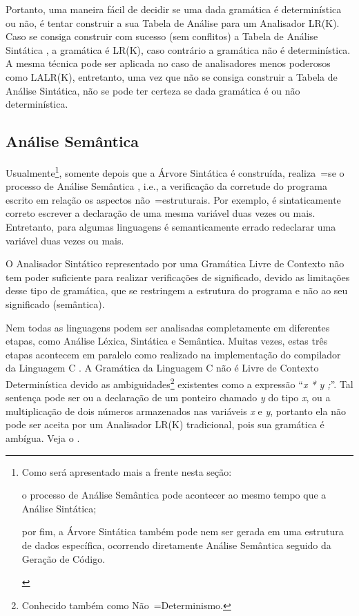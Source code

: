 Portanto,
uma maneira fácil de decidir se uma dada gramática é determinística ou
não,
é tentar construir a sua Tabela de Análise para um Analisador LR(K).
Caso se consiga construir com sucesso (sem conflitos) a Tabela de Análise Sintática \cite{ahoCompilerDragonBook},
a gramática é LR(K),
caso contrário a gramática não é determinística.
A mesma técnica pode ser aplicada no caso de analisadores menos poderosos como LALR(K),
entretanto,
uma vez que não se consiga construir a Tabela de Análise Sintática,
não se pode ter certeza se dada gramática é ou
não determinística.


\subsection{Análise Semântica}
\label{analiseSemantica}

Usualmente\footnote{
Como será apresentado mais a frente nesta seção:
\begin{inparaenum}[1)]
\item o processo de Análise Semântica pode acontecer ao mesmo tempo que a Análise Sintática;
\item por fim,
a Árvore Sintática também pode nem ser gerada em uma estrutura de dados específica,
ocorrendo diretamente Análise Semântica seguido da Geração de Código.
\end{inparaenum}%
},
somente depois que a Árvore Sintática é construída,
realiza~=se o processo de Análise Semântica \cite{ahoCompilerDragonBook},
i.e.,
a verificação da corretude do programa escrito em relação os aspectos não~=estruturais.
Por exemplo,
é sintaticamente correto escrever a declaração de uma mesma variável duas vezes ou
mais. Entretanto,
para algumas linguagens é semanticamente errado redeclarar uma variável duas vezes ou
mais.

O Analisador Sintático representado por uma Gramática Livre de Contexto não tem poder suficiente para realizar verificações de significado,
devido as limitações desse tipo de gramática,
que se restringem a estrutura do programa e
não ao seu significado (semântica).

Nem todas as linguagens podem ser analisadas completamente em diferentes etapas,
como Análise Léxica, Sintática e Semântica. Muitas vezes,
estas três etapas acontecem em paralelo como realizado na implementação do compilador da Linguagem C \cite{jourdan2017,whyCcannotBeParsedWithALR1Parser}.
A Gramática da Linguagem C não é Livre de Contexto Determinística devido as ambiguidades\footnote{
Conhecido também como Não~=Determinismo.
}
existentes como a expressão ``\textit{x * y ;}''.
Tal sentença pode ser ou
a declaração de um ponteiro chamado \textit{y} do tipo \textit{x},
ou a multiplicação de dois números armazenados nas variáveis \textit{x} e
\textit{y},
portanto ela não pode ser aceita por um Analisador LR(K) tradicional,
pois sua gramática é ambígua.
Veja o .

